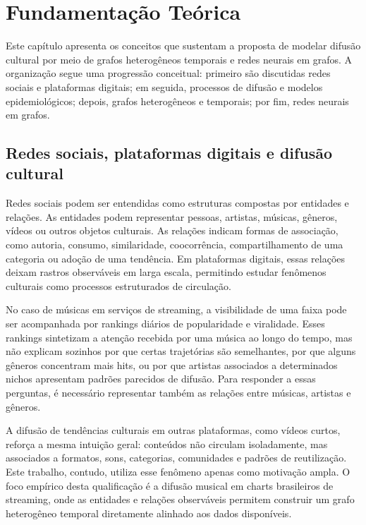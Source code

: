 \chapter{Fundamentação Teórica}
\label{cap:fundamentacao}

Este capítulo apresenta os conceitos que sustentam a proposta de modelar difusão cultural por meio de grafos heterogêneos temporais e redes neurais em grafos. A organização segue uma progressão conceitual: primeiro são discutidas redes sociais e plataformas digitais; em seguida, processos de difusão e modelos epidemiológicos; depois, grafos heterogêneos e temporais; por fim, redes neurais em grafos.


\section{Redes sociais, plataformas digitais e difusão cultural}

Redes sociais podem ser entendidas como estruturas compostas por entidades e relações. As entidades podem representar pessoas, artistas, músicas, gêneros, vídeos ou outros objetos culturais. As relações indicam formas de associação, como autoria, consumo, similaridade, coocorrência, compartilhamento de uma categoria ou adoção de uma tendência. Em plataformas digitais, essas relações deixam rastros observáveis em larga escala, permitindo estudar fenômenos culturais como processos estruturados de circulação.

No caso de músicas em serviços de streaming, a visibilidade de uma faixa pode ser acompanhada por rankings diários de popularidade e viralidade. Esses rankings sintetizam a atenção recebida por uma música ao longo do tempo, mas não explicam sozinhos por que certas trajetórias são semelhantes, por que alguns gêneros concentram mais hits, ou por que artistas associados a determinados nichos apresentam padrões parecidos de difusão. Para responder a essas perguntas, é necessário representar também as relações entre músicas, artistas e gêneros.

A difusão de tendências culturais em outras plataformas, como vídeos curtos, reforça a mesma intuição geral: conteúdos não circulam isoladamente, mas associados a formatos, sons, categorias, comunidades e padrões de reutilização. Este trabalho, contudo, utiliza esse fenômeno apenas como motivação ampla. O foco empírico desta qualificação é a difusão musical em charts brasileiros de streaming, onde as entidades e relações observáveis permitem construir um grafo heterogêneo temporal diretamente alinhado aos dados disponíveis.

